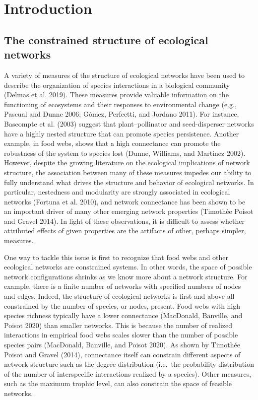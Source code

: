 \documentclass[11pt]{article}
\begin{document}
\clearpage
\linenumbers
\pagestyle{normal}

\hypertarget{introduction}{%
\section{Introduction}\label{introduction}}

\hypertarget{the-constrained-structure-of-ecological-networks}{%
\subsection{The constrained structure of ecological
networks}\label{the-constrained-structure-of-ecological-networks}}

A variety of measures of the structure of ecological networks have been
used to describe the organization of species interactions in a
biological community (Delmas et al. 2019). These measures provide
valuable information on the functioning of ecosystems and their
responses to environmental change (e.g., Pascual and Dunne 2006; Gómez,
Perfectti, and Jordano 2011). For instance, Bascompte et al. (2003)
suggest that plant--pollinator and seed-disperser networks have a highly
nested structure that can promote species persistence. Another example,
in food webs, shows that a high connectance can promote the robustness
of the system to species lost (Dunne, Williams, and Martinez 2002).
However, despite the growing literature on the ecological implications
of network structure, the association between many of these measures
impedes our ability to fully understand what drives the structure and
behavior of ecological networks. In particular, nestedness and
modularity are strongly associated in ecological networks (Fortuna et
al. 2010), and network connectance has been shown to be an important
driver of many other emerging network properties (Timothée Poisot and
Gravel 2014). In light of these observations, it is difficult to assess
whether attributed effects of given properties are the artifacts of
other, perhaps simpler, measures.

One way to tackle this issue is first to recognize that food webs and
other ecological networks are constrained systems. In other words, the
space of possible network configurations shrinks as we know more about a
network structure. For example, there is a finite number of networks
with specified numbers of nodes and edges. Indeed, the structure of
ecological networks is first and above all constrained by the number of
species, or nodes, present. Food webs with high species richness
typically have a lower connectance (MacDonald, Banville, and Poisot
2020) than smaller networks. This is because the number of realized
interactions in empirical food webs scales slower than the number of
possible species pairs (MacDonald, Banville, and Poisot 2020). As shown
by Timothée Poisot and Gravel (2014), connectance itself can constrain
different aspects of network structure such as the degree distribution
(i.e.~the probability distribution of the number of interspecific
interactions realized by a species). Other measures, such as the maximum
trophic level, can also constrain the space of feasible networks.
\end{document}
